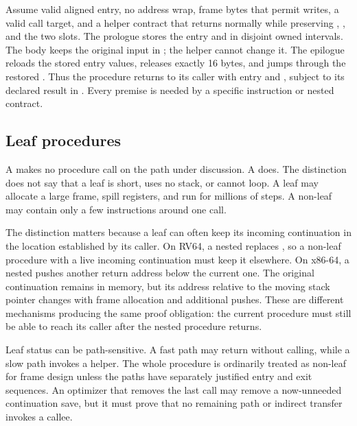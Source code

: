 \begin{proofkit}[title={RV64 non-leaf preservation}]
Assume valid aligned entry, no address wrap, frame bytes that permit writes, a valid call
target, and a helper contract that returns normally while preserving ,
, and the two slots. The prologue stores the entry  and
 in disjoint owned intervals. The body keeps the original input in
; the helper cannot change it. The epilogue reloads the stored entry
values, releases exactly 16 bytes, and jumps through the restored .
Thus the procedure returns to its caller with entry  and ,
subject to its declared result in . Every premise is needed by a
specific instruction or nested contract.
\end{proofkit}

\subsection{Leaf procedures}

A  makes no procedure call on the path under
discussion. A  does. The distinction does not say
that a leaf is short, uses no stack, or cannot loop. A leaf may allocate a
large frame, spill registers, and run for millions of steps. A non-leaf may
contain only a few instructions around one call.

The distinction matters because a leaf can often keep its incoming
continuation in the location established by its caller. On RV64, a nested
 replaces , so a non-leaf procedure with a live
incoming continuation must keep it elsewhere. On x86-64, a nested
 pushes another return address below the current one. The original
continuation remains in memory, but its address relative to the moving stack
pointer changes with frame allocation and additional pushes. These are
different mechanisms producing the same proof obligation: the current
procedure must still be able to reach its caller after the nested procedure
returns.

Leaf status can be path-sensitive. A fast path may return without calling,
while a slow path invokes a helper. The whole procedure is ordinarily treated
as non-leaf for frame design unless the paths have separately justified
entry and exit sequences. An optimizer that removes the last call may remove a
now-unneeded continuation save, but it must prove that no remaining path or
indirect transfer invokes a callee.

